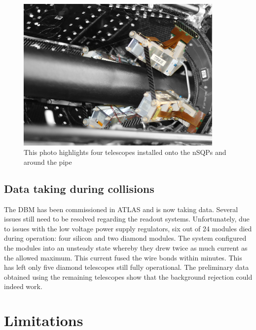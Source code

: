 \documentclass[12pt]{packages/mytustyle}  %
\begin{document}
\begin{figure}[!t]
\centering
\includegraphics[width=0.9\textwidth]{pics/DBM-installed-colour1}
\caption{This photo highlights four telescopes installed onto the nSQPs and around the pipe}
\label{fig:dbminatlas}
\end{figure}


\subsection{Data taking during collisions}
The DBM has been commissioned in ATLAS and is now taking data. Several issues still need to be resolved regarding the readout systems. Unfortunately, due to issues with the low voltage power supply regulators, six out of 24 modules died during operation: four silicon and two diamond modules. The system configured the modules into an unsteady state whereby they drew twice as much current as the allowed maximum. This current fused the wire bonds within minutes. This has left only five diamond telescopes still fully operational. The preliminary data obtained using the remaining telescopes show that the background rejection could indeed work. 






\section{Limitations}
\label{sec:limitations}
\end{document}

